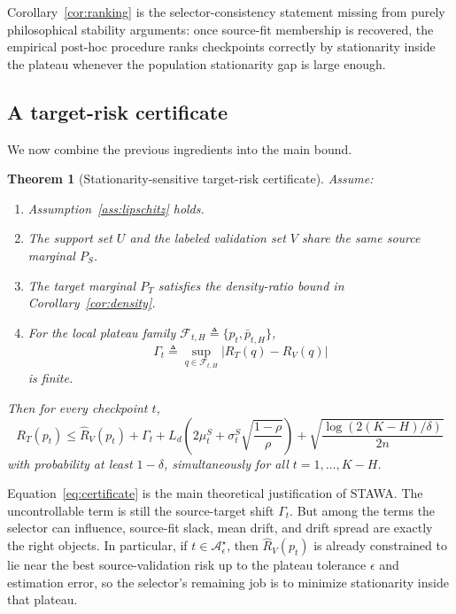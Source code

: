 \documentclass{article}
\newtheorem{theorem}{Theorem}
\newcommand{\stawa}{\textup{\textsc{STAWA}}}
\begin{document}
Corollary~\ref{cor:ranking} is the selector-consistency statement missing from purely philosophical stability arguments: once source-fit membership is recovered, the empirical post-hoc procedure ranks checkpoints correctly by stationarity inside the plateau whenever the population stationarity gap is large enough.

\subsection{A target-risk certificate}

We now combine the previous ingredients into the main bound.

\begin{theorem}[Stationarity-sensitive target-risk certificate]
\label{thm:certificate}
Assume:
\begin{enumerate}[label=(\roman*), leftmargin=1.5em]
    \item Assumption~\ref{ass:lipschitz} holds.
    \item The support set $U$ and the labeled validation set $V$ share the same source marginal $P_S$.
    \item The target marginal $P_T$ satisfies the density-ratio bound in Corollary~\ref{cor:density}.
    \item For the local plateau family $\mathcal{F}_{t,H} \triangleq \{p_t,\bar p_{t,H}\}$,
    \begin{equation}
        \Gamma_t
        \triangleq
        \sup_{q\in \mathcal{F}_{t,H}}
        |R_T(q)-R_V(q)|
    \end{equation}
    is finite.
\end{enumerate}
Then for every checkpoint $t$,
\begin{equation}
    R_T(p_t)
    \le
    \hat R_V(p_t)
    +
    \Gamma_t
    +
    L_d \left(
        2\mu_t^S + \sigma_t^S \sqrt{\frac{1-\rho}{\rho}}
    \right)
    +
    \sqrt{\frac{\log(2(K-H)/\delta)}{2n}}
    \label{eq:certificate}
\end{equation}
with probability at least $1-\delta$, simultaneously for all $t=1,\dots,K-H$.
\end{theorem}

Equation~\eqref{eq:certificate} is the main theoretical justification of \stawa{}. The uncontrollable term is still the source-target shift $\Gamma_t$. But among the terms the selector can influence, source-fit slack, mean drift, and drift spread are exactly the right objects. In particular, if $t\in\mathcal{A}_{\epsilon}^\star$, then $\hat R_V(p_t)$ is already constrained to lie near the best source-validation risk up to the plateau tolerance $\epsilon$ and estimation error, so the selector's remaining job is to minimize stationarity inside that plateau.
\end{document}

